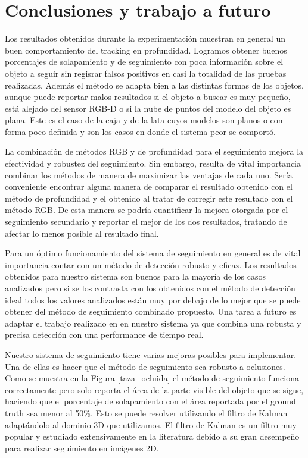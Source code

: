 \chapter{Conclusiones y trabajo a futuro}\label{chap:conclusiones}
Los resultados obtenidos durante la experimentación muestran en general un buen comportamiento del tracking en profundidad. Logramos obtener buenos porcentajes de solapamiento y de seguimiento con poca información sobre el objeto a seguir sin regisrar falsos positivos en casi la totalidad de las pruebas realizadas. Además el método se adapta bien a las distintas formas de los objetos, aunque puede reportar malos resultados si el objeto a buscar es muy pequeño, está alejado del sensor RGB-D o si la nube de puntos del modelo del objeto es plana. Este es el caso de la caja y de la lata cuyos modelos son planos o con forma poco definida y son los casos en donde el sistema peor se comportó.

La combinación de métodos RGB y de profundidad para el seguimiento mejora la efectividad y robustez del seguimiento. Sin embargo, resulta de vital importancia combinar los métodos de manera de maximizar las ventajas de cada uno. Sería conveniente encontrar alguna manera de comparar el resultado obtenido con el método de profundidad y el obtenido al tratar de corregir este resultado con el método RGB. De esta manera se podría cuantificar la mejora otorgada por el seguimiento secundario y reportar el mejor de los dos resultados, tratando de afectar lo menos posible al resultado final.

Para un óptimo funcionamiento del sistema de seguimiento en general es de vital importancia contar con un método de detección robusto y eficaz. Los resultados obtenidos para nuestro sistema son buenos para la mayoría de los casos analizados pero si se los contrasta con los obtenidos con el método de detección ideal todos los valores analizados están muy por debajo de lo mejor que se puede obtener del método de seguimiento combinado propuesto. Una tarea a futuro es adaptar el trabajo realizado en \cite{hinterstoisser2010dominant} en nuestro sistema ya que combina una robusta y precisa detección con una performance de tiempo real.

Nuestro sistema de seguimiento tiene varias mejoras posibles para implementar. Una de ellas es hacer que el método de seguimiento sea robusto a oclusiones. Como se muestra en la Figura \ref{taza_ocluida} el método de seguimiento funciona correctamente pero solo reporta el área de la parte visible del objeto que se sigue, haciendo que el porcentaje de solapamiento con el área reportada por el ground truth sea menor al 50\%. Esto se puede resolver utilizando el filtro de Kalman \cite{welch1995introduction} adaptándolo al dominio 3D que utilizamos. El filtro de Kalman es un filtro muy popular y estudiado extensivamente en la literatura \cite{julier1997new,wan2000unscented} debido a su gran desempeño para realizar seguimiento en imágenes 2D.

